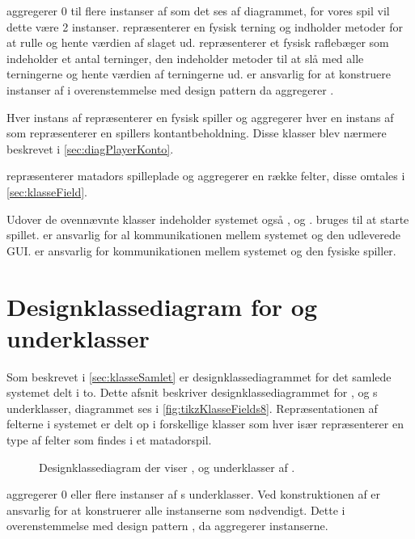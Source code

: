  aggregerer 0 til flere instanser af  som det ses af diagrammet, for vores spil vil dette være 2 instanser.  repræsenterer en fysisk terning og indholder metoder for at rulle og hente værdien af slaget ud.  repræsenterer et fysisk raflebæger som indeholder et antal terninger, den indeholder metoder til at slå med alle terningerne og hente værdien af terningerne ud.  er ansvarlig for at konstruere instanser af  i overenstemmelse med design pattern  da  aggregerer .

Hver instans af  repræsenterer en fysisk spiller og aggregerer hver en instans af  som repræsenterer en spillers kontantbeholdning. Disse klasser blev nærmere beskrevet i \vref{sec:diagPlayerKonto}.

 repræsenterer matadors spilleplade og aggregerer en række felter, disse omtales i \vref{sec:klasseField}.

Udover de ovennævnte klasser indeholder systemet også ,  og .  bruges til at starte spillet.  er ansvarlig for al kommunikationen mellem systemet og den udleverede GUI.  er ansvarlig for kommunikationen mellem systemet og den fysiske spiller.

\section{Designklassediagram for  og underklasser}\label{sec:klasseField}

Som beskrevet i \vref{sec:klasseSamlet} er designklassediagrammet for det samlede systemet delt i to. Dette afsnit beskriver designklassediagrammet for ,  og s underklasser, diagrammet ses i \vref{fig:tikzKlasseFields8}. Repræsentationen af felterne i systemet er delt op i forskellige klasser som hver især repræsenterer en type af felter som findes i et matadorspil.

\begin{figure}
\caption{Designklassediagram der viser ,  og underklasser af .}\label{fig:tikzKlasseFields8}
\centering

\end{figure}

 aggregerer 0 eller flere instanser af s underklasser. Ved konstruktionen af  er  ansvarlig for at konstruerer alle instanserne som nødvendigt. Dette i overenstemmelse med design pattern , da  aggregerer instanserne.

